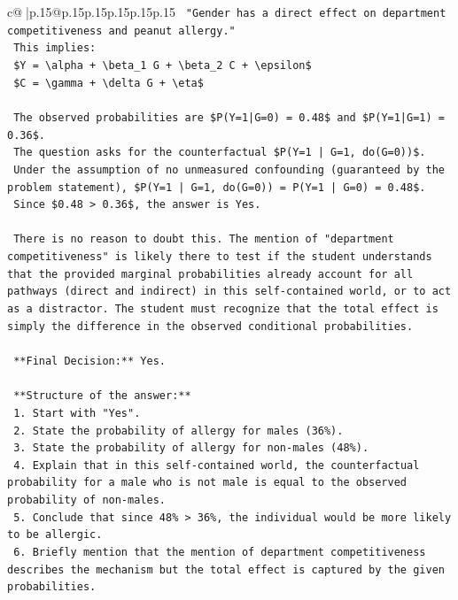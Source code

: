 \documentclass{article}
\begin{document}
{\begin{supertabular}{c@{$\;$}|p{.15\linewidth}@{}p{.15\linewidth}p{.15\linewidth}p{.15\linewidth}p{.15\linewidth}p{.15\linewidth}}
{{{\texttt{    "Gender has a direct effect on department competitiveness and peanut allergy."} \\
\texttt{    This implies:} \\
\texttt{    \$Y = \textbackslash{}alpha + \textbackslash{}beta\_1 G + \textbackslash{}beta\_2 C + \textbackslash{}epsilon\$} \\
\texttt{    \$C = \textbackslash{}gamma + \textbackslash{}delta G + \textbackslash{}eta\$} \\
\\ 
\texttt{    The observed probabilities are \$P(Y=1|G=0) = 0.48\$ and \$P(Y=1|G=1) = 0.36\$.} \\
\texttt{    The question asks for the counterfactual \$P(Y=1 | G=1, do(G=0))\$.} \\
\texttt{    Under the assumption of no unmeasured confounding (guaranteed by the problem statement), \$P(Y=1 | G=1, do(G=0)) = P(Y=1 | G=0) = 0.48\$.} \\
\texttt{    Since \$0.48 > 0.36\$, the answer is Yes.} \\
\\ 
\texttt{    There is no reason to doubt this. The mention of "department competitiveness" is likely there to test if the student understands that the provided marginal probabilities already account for all pathways (direct and indirect) in this self{-}contained world, or to act as a distractor. The student must recognize that the total effect is simply the difference in the observed conditional probabilities.} \\
\\ 
\texttt{    **Final Decision:** Yes.} \\
\\ 
\texttt{    **Structure of the answer:**} \\
\texttt{    1. Start with "Yes".} \\
\texttt{    2. State the probability of allergy for males (36\%).} \\
\texttt{    3. State the probability of allergy for non{-}males (48\%).} \\
\texttt{    4. Explain that in this self{-}contained world, the counterfactual probability for a male who is not male is equal to the observed probability of non{-}males.} \\
\texttt{    5. Conclude that since 48\% > 36\%, the individual would be more likely to be allergic.} \\
\texttt{    6. Briefly mention that the mention of department competitiveness describes the mechanism but the total effect is captured by the given probabilities.} \\
}}}
\end{supertabular}}
\end{document}
